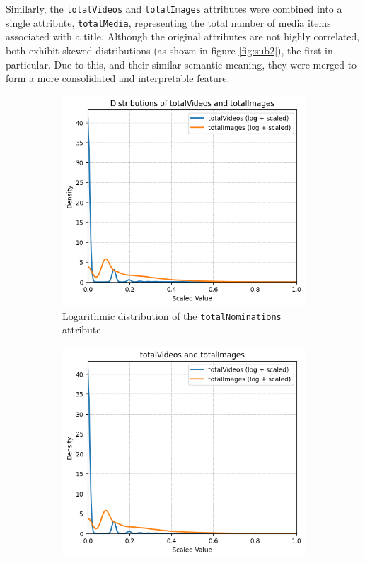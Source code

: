 Similarly, the \texttt{totalVideos} and \texttt{totalImages} attributes were combined into a single
attribute, \texttt{totalMedia}, representing the total number of media items associated with a title.
Although the original attributes are not highly correlated, both exhibit skewed distributions (as shown in figure \ref{fig:sub2}), the first
in particular.
Due to this, and their similar semantic meaning, they were merged to form a more consolidated and
interpretable feature.

\begin{figure}[H]
    \centering
    \begin{subfigure}{0.48\textwidth}
        \includegraphics[width=\textwidth]{plots/nominations_distrib.png}
        \caption{Logarithmic distribution of the \texttt{totalNominations} attribute}
        \label{fig:sub1}
    \end{subfigure}
    \begin{subfigure}{0.48\textwidth}
        \includegraphics[width=\textwidth]{plots/totalVideos_Images_distrib.png}

\end{subfigure}
\end{figure}
